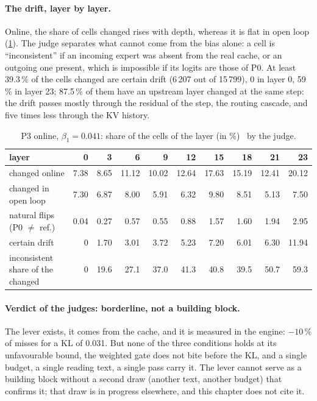 \paragraph{The drift, layer by layer.} Online, the share of cells changed rises with depth, whereas it is flat in open loop (\cref{t3mim:tab:p3-derive}). The judge separates what cannot come from the bias alone: a cell is ``inconsistent'' if an incoming expert was absent from the real cache, or an outgoing one present, which is impossible if its logits are those of P0. At least 39.3\,\% of the cells changed are certain drift (6\,207 out of 15\,799), 0 in layer 0, 59\,\% in layer 23; 87.5\,\% of them have an upstream layer changed at the same step: the drift passes mostly through the residual of the step, the routing cascade, and five times less through the KV history.

\begin{table}[tbp]
\centering\small
\caption[P3 online: the drift per layer]{P3 online, $\beta_1 = 0.041$: share of the cells of the layer (in \%) \mes~by the judge.}
\label{t3mim:tab:p3-derive}
\setlength{\tabcolsep}{4.2pt}
\begin{tabular}{@{}lrrrrrrrrr@{}}
\toprule
layer & 0 & 3 & 6 & 9 & 12 & 15 & 18 & 21 & 23 \\
\midrule
changed online & 7.38 & 8.65 & 11.12 & 10.02 & 12.64 & 17.63 & 15.19 & 12.41 & 20.12 \\
changed in open loop & 7.30 & 6.87 & 8.00 & 5.91 & 6.32 & 9.80 & 8.51 & 5.13 & 7.50 \\
natural flips (P0 $\ne$ ref.) & 0.04 & 0.27 & 0.57 & 0.55 & 0.88 & 1.57 & 1.60 & 1.94 & 2.95 \\
certain drift & 0 & 1.70 & 3.01 & 3.72 & 5.23 & 7.20 & 6.01 & 6.30 & 11.94 \\
inconsistent share of the changed & 0 & 19.6 & 27.1 & 37.0 & 41.3 & 40.8 & 39.5 & 50.7 & 59.3 \\
\bottomrule
\end{tabular}
\end{table}

\paragraph{Verdict of the judges: borderline, not a building block.} The lever exists, it comes from the cache, and it is measured in the engine: $-10\,\%$ of misses for a KL of 0.031. But none of the three conditions holds at its unfavourable bound, the weighted gate does not bite before the KL, and a single budget, a single reading text, a single pass carry it. The lever cannot serve as a building block without a second draw (another text, another budget) that confirms it; that draw is in progress elsewhere, and this chapter does not cite it.

